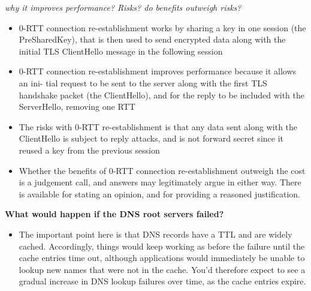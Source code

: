 \documentclass{article}
\begin{document}
\textit{why it improves performance? Risks? do benefits outweigh risks?}
\begin{itemize}
    \item 0-RTT connection re-establishment works by sharing a key in one session
    (the PreSharedKey), that is then used to send encrypted data along with the initial
    TLS ClientHello message in the following session
    \item 0-RTT connection re-establishment improves performance because it allows an ini-
    tial request to be sent to the server along with the first TLS handshake packet (the
    ClientHello), and for the reply to be included with the ServerHello, removing one RTT
    \item The risks with 0-RTT re-establishment is that any data sent along with the
    ClientHello is subject to reply attacks, and is not forward secret since it
    reused a key from the previous session
    \item  Whether the benefits of 0-RTT connection re-establishment outweigh the cost is a
    judgement call, and answers may legitimately argue in either way. There is
    available for stating an opinion, and for providing a reasoned justification.
\end{itemize}


\textbf{What would happen if the DNS root servers failed?}
\begin{itemize}
    \item The important point here is that DNS records have a TTL and are widely
    cached. Accordingly, things would keep working as before the failure until
    the cache entries time out, although applications would immediately be unable
    to lookup new names that were not in the cache. You'd therefore expect to
    see a gradual increase in DNS lookup failures over time, as the cache entries expire.
\end{itemize}

\clearpage
\end{document}
